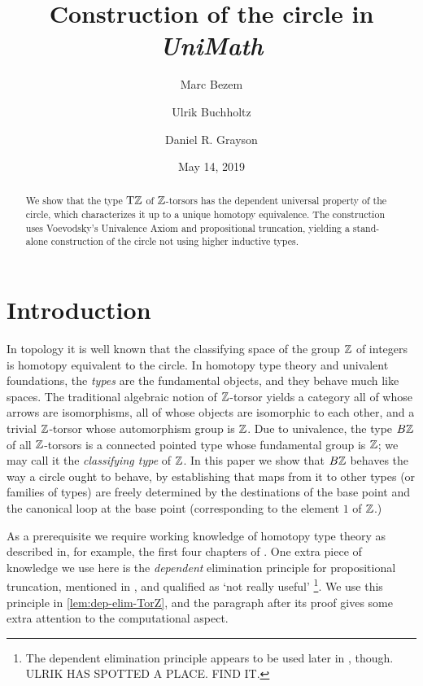 \documentclass[a4,12pt]{amsart}
\begin{document}
\newcommand{\UniMath}{\emph{UniMath}}
\title{Construction of the circle in \UniMath}
{
    \author{Marc Bezem}
    \address{Department of Informatics, University of Bergen}
    \urladdr{}
}
{
    \author{Ulrik Buchholtz}
    \address{}
    \email{}
    \urladdr{}
}
{
    \author{Daniel R. Grayson}
}

\date{May 14, 2019}

\begin{abstract}
We show that the type ${\mathrm{T}\mathbb{Z}}$ of $\mathbb{Z}$-torsors has the dependent universal property of the circle, 
which characterizes it up to a unique homotopy equivalence.  
The construction uses Voevodsky's Univalence Axiom and propositional truncation, 
yielding a stand-alone construction of the
circle not using higher inductive types.
\end{abstract}

\maketitle
{}
\tableofcontents

\section{Introduction}

In topology it is well known that the classifying space of the group $\mathbb{Z}$ of integers is homotopy equivalent to the circle.  In homotopy type
theory and univalent foundations, the {\em types} are the fundamental objects, and they behave much like spaces.  The traditional algebraic
notion of $\mathbb{Z}$-torsor yields a category all of whose arrows are isomorphisms, all of whose objects are isomorphic to each other, and a
trivial $\mathbb{Z}$-torsor whose automorphism group is $\mathbb{Z}$.  Due to univalence, the type $B\mathbb{Z}$ of all $\mathbb{Z}$-torsors is a connected pointed type
whose fundamental group is $\mathbb{Z}$; we may call it the {\em classifying type} of $\mathbb{Z}$.  In this paper we show that $B\mathbb{Z}$ behaves the way a
circle ought to behave, by establishing that maps from it to other types (or families of types) are freely determined by the destinations of the
base point and the canonical loop at the base point (corresponding to the element $1$ of $\mathbb{Z}$.)

As a prerequisite we require working knowledge of homotopy type theory
as described in, for example, the first four chapters of \cite{hottbook}.
One extra piece of knowledge we use here is the \emph{dependent} elimination
principle for propositional truncation, mentioned in \cite[Ch. 6.9]{hottbook},
and qualified as `not really useful'%
\footnote{The dependent elimination principle appears to 
be used later in \cite{hottbook}, though. ULRIK HAS SPOTTED A PLACE.  FIND IT.}.
We use this principle in \cref{lem:dep-elim-TorZ}, and the paragraph after
its proof gives some extra attention to the computational aspect.
\end{document}
